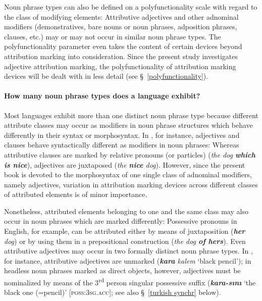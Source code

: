 Noun phrase types can also be defined on a polyfunctionality scale with regard to the class of modifying elements: Attributive adjectives and other adnominal modifiers (demonstratives, bare nouns or noun phrases, adposition phrases, clauses, etc.) may or may not occur in similar noun phrase types. The polyfunctionality parameter even takes the content of certain devices beyond attribution marking into consideration. Since the present study investigates adjective attribution marking, the polyfunctionality of attribution marking devices will be dealt with in less detail (see \S~\ref{polyfunctionality}). 

\paragraph{How many noun phrase types does a language exhibit?} 
Most languages exhibit more than one distinct noun phrase type because different attribute classes may occur as modifiers in noun phrase structures which behave differently in their syntax or morphosyntax. In , for instance, adjectives and clauses behave syntactically different as modifiers in noun phrases: Whereas attributive clauses are marked by relative pronouns (or particles) (\textit{the dog \textbf{which is nice}}), adjectives are juxtaposed (\textit{the \textbf{nice} dog}). However, since the present book is devoted to the morphosyntax of one single class of adnominal modifiers, namely adjectives, variation in attribution marking devices across different classes of attributed elements is of minor importance. 

Nonetheless, attributed elements belonging to one and the same class may also occur in noun phrases which are marked differently: Possessive pronouns in English, for example, can be attributed either by means of juxtaposition (\textit{\textbf{her} dog}) or by using them in a prepositional construction (\textit{the dog \textbf{of hers}}). Even attributive adjectives may occur in two formally distinct noun phrase types. In , for instance, attributive adjectives are unmarked (\textit{\textbf{kara} kalem} ‘black pencil’); in headless noun phrases marked as direct objects, however, adjectives must be nominalized by means of the 3\textsuperscript{rd} person singular possessive suffix (\textit{\textbf{kara-sını}} ‘the black one (=pencil)’ [\textsc{poss:3sg.acc}]; see also \S~\ref{turkish synchr} below). 

